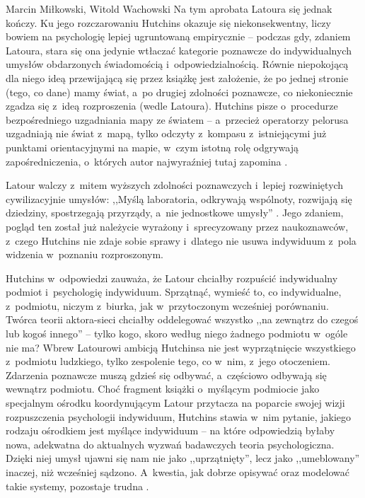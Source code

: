\begin{artplenv2auth}{Marcin Miłkowski, Witold Wachowski}
Na tym aprobata Latoura się jednak kończy. Ku jego rozczarowaniu Hutchins okazuje się niekonsekwentny, liczy bowiem na psychologię lepiej ugruntowaną empirycznie -- podczas gdy, zdaniem Latoura, stara się ona jedynie wtłaczać kategorie poznawcze do indywidualnych umysłów obdarzonych świadomością i~odpowiedzialnością. Równie niepokojącą dla niego ideą przewijającą się przez książkę jest założenie, że po jednej stronie (tego, co dane) mamy świat, a~po drugiej zdolności poznawcze, co niekoniecznie zgadza się z~ideą rozproszenia (wedle Latoura). Hutchins pisze o~procedurze bezpośredniego uzgadniania mapy ze światem -- a~przecież operatorzy pelorusa uzgadniają nie świat z~mapą, tylko odczyty z~kompasu z~istniejącymi już punktami orientacyjnymi na mapie, w~czym istotną rolę odgrywają zapośredniczenia, o~których autor najwyraźniej tutaj zapomina
\parencite[][s.~60]{latour_cogito_1996}.%


Latour walczy z~mitem wyższych zdolności poznawczych i~lepiej rozwiniętych cywilizacyjnie umysłów: ,,Myślą laboratoria, odkrywają wspólnoty, rozwijają się dziedziny, spostrzegają przyrządy, a~nie jednostkowe umysły''
\parencite[][s.~61]{latour_cogito_1996}. %
 Jego zdaniem, pogląd ten został już należycie wyrażony i~sprecyzowany przez naukoznawców, z~czego Hutchins nie zdaje sobie sprawy i~dlatego nie usuwa indywiduum z~pola widzenia w~poznaniu rozproszonym.

Hutchins w~odpowiedzi zauważa, że Latour chciałby rozpuścić indywidualny podmiot i~psychologię indywiduum. Sprzątnąć, wymieść to, co indywidualne, z~podmiotu, niczym z~biurka, jak w~przytoczonym wcześniej porównaniu. Twórca teorii aktora-sieci chciałby oddelegować wszystko ,,na zewnątrz do czegoś lub kogoś innego'' -- tylko kogo, skoro według niego żadnego podmiotu w~ogóle nie ma? Wbrew Latourowi ambicją Hutchinsa nie jest wyprzątnięcie wszystkiego z~podmiotu ludzkiego, tylko zespolenie tego, co w~nim, z~jego otoczeniem. Zdarzenia poznawcze muszą gdzieś się odbywać, a~częściowo odbywają się wewnątrz podmiotu. Choć fragment książki o~myślącym podmiocie jako specjalnym ośrodku koordynującym Latour przytacza na poparcie swojej wizji rozpuszczenia psychologii indywiduum, Hutchins stawia w~nim pytanie, jakiego rodzaju ośrodkiem jest myślące indywiduum -- na które odpowiedzią byłaby nowa, adekwatna do aktualnych wyzwań badawczych teoria psychologiczna. Dzięki niej umysł ujawni się nam nie jako ,,uprzątnięty'', lecz jako ,,umeblowany'' inaczej, niż wcześniej sądzono. A~kwestia, jak dobrze opisywać oraz modelować takie systemy, pozostaje trudna
\parencite[][s.~64–66, 68]{hutchins_response_1996}.%



\end{artplenv2auth}
